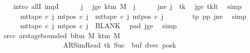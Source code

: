 \begin{isabellebody}
\ \ \isamarkupfalse%
\ {\isacharparenleft}{\kern0pt}intro\ allI\ impI{\isacharparenright}{\kern0pt}\isanewline
\ \ \ \ \isamarkupfalse%
\ j\ \isamarkupfalse%
\ jge{\isacharcolon}{\kern0pt}\ {\isachardoublequoteopen}k{\isacharunderscore}{\kern0pt}tm\ M\ {\isasymle}\ j{\isachardoublequoteclose}\isanewline
\ \ \ \ \isamarkupfalse%
\ jne{\isacharcolon}{\kern0pt}\ {\isachardoublequoteopen}j\ {\isasymnoteq}\ tk{\isachardoublequoteclose}\ \isamarkupfalse%
\ jge\ tk{\isacharunderscore}{\kern0pt}lt\ \isamarkupfalse%
\ simp\isanewline
\ \ \ \ \isamarkupfalse%
\ {\isachardoublequoteopen}mt{\isacharunderscore}{\kern0pt}tape\ c{}\ j\ {\isacharparenleft}{\kern0pt}mt{\isacharunderscore}{\kern0pt}pos\ c{}\ j{\isacharparenright}{\kern0pt}\ {\isacharequal}{\kern0pt}\ mt{\isacharunderscore}{\kern0pt}tape\ c{\isacharprime}{\kern0pt}\ j\ {\isacharparenleft}{\kern0pt}mt{\isacharunderscore}{\kern0pt}pos\ c{\isacharprime}{\kern0pt}\ j{\isacharparenright}{\kern0pt}{\isachardoublequoteclose}\isanewline
\ \ \ \ \ \ \isamarkupfalse%
\ tp{}\ pp{}\ jne\ \isamarkupfalse%
\ simp\isanewline
\ \ \ \ \isamarkupfalse%
\ {\isachardoublequoteopen}mt{\isacharunderscore}{\kern0pt}tape\ c{}\ j\ {\isacharparenleft}{\kern0pt}mt{\isacharunderscore}{\kern0pt}pos\ c{}\ j{\isacharparenright}{\kern0pt}\ {\isacharequal}{\kern0pt}\ BLANK{}{\isachardoublequoteclose}\ \isamarkupfalse%
\ pad{}\ jge\ \isamarkupfalse%
\ simp\isanewline
\ \ \isamarkupfalse%
\isanewline
\ \ \isamarkupfalse%
\ src{\isacharunderscore}{\kern0pt}c{}{\isacharcolon}{\kern0pt}\ {\isachardoublequoteopen}ar{\isacharunderscore}{\kern0pt}stage{\isacharunderscore}{\kern0pt}bounded\ {\isacharparenleft}{\kern0pt}bl{\isacharunderscore}{\kern0pt}tm\ M{\isacharparenright}{\kern0pt}\ {\isacharparenleft}{\kern0pt}k{\isacharunderscore}{\kern0pt}tm\ M{\isacharparenright}{\kern0pt}\isanewline
\ \ \ \ \ \ \ \ \ \ \ \ \ \ \ \ \ \ {\isacharparenleft}{\kern0pt}AR{\isacharunderscore}{\kern0pt}SimRead{\isacharcomma}{\kern0pt}\ tk{\isacharcomma}{\kern0pt}\ Suc\ {}{\isacharcomma}{\kern0pt}\ buf{\isacharcomma}{\kern0pt}\ dvec{\isacharcomma}{\kern0pt}\ posk{\isacharparenright}{\kern0pt}{\isachardoublequoteclose}\isanewline
\ \ \ \ \isamarkupfalse%

\end{isabellebody}
